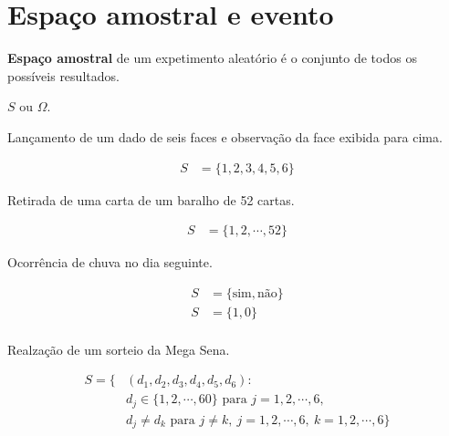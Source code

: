 \section{Espaço amostral e evento}

\begin{definition}
    \textbf{Espaço amostral} de um expetimento aleatório é o conjunto de
    todos os possíveis resultados.
\end{definition}

\begin{notation}
    $S$ ou $\Omega$.
\end{notation}

\begin{example}\label{exp:ch01-espacoamostral-1}
    Lançamento de um dado de seis faces e observação da face
    exibida para cima.

    \begin{align*}
        S &= \{1,2,3,4,5,6\}
    \end{align*}
\end{example}

\begin{example}\label{exp:ch01-espacoamostral-2}
    Retirada de uma carta de um baralho de 52 cartas.

    \begin{align*}
        S &= \{1,2, \cdots ,52\}
    \end{align*}
\end{example}

\begin{example}\label{exp:ch01-espacoamostral-3}
    Ocorrência de chuva no dia seguinte.

    \begin{align*}
        S &= \{\text{sim}, \text{não}\} \\
        S &= \{1, 0\} \\
    \end{align*}
\end{example}

\begin{example}\label{exp:ch01-espacoamostral-4}
    Realzação de um sorteio da Mega Sena.

    \begin{align*}
        S = \{&(d_1, d_2, d_3, d_4, d_5, d_6): \\
            & d_j \in \{1, 2, \cdots, 60 \} \text{ para } j = 1, 2, \cdots, 6, \\
            & d_j \neq d_k \text{ para } j\neq k,\ 
                j = 1, 2, \cdots, 6,\ k = 1, 2, \cdots, 6
        \}
    \end{align*}
\end{example}

